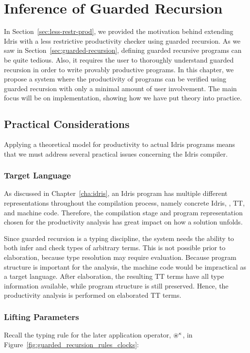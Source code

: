 \chapter{Inference of Guarded Recursion}
\label{cha:infer-guard-recurs}
In Section~\ref{sec:less-restr-prod}, we provided the motivation behind
extending Idris with a less restrictive productivity checker using guarded
recursion. As we saw in Section~\ref{sec:guarded-recursion}, defining guarded
recursive programs can be quite tedious. Also, it requires the user to thoroughly
understand guarded recursion in order to write provably productive programs. In
this chapter, we propose a system where the productivity of programs can be
verified using guarded recursion with only a minimal amount of user
involvement. The main focus will be on implementation, showing how we have put theory into practice.

\section{Practical Considerations}
Applying a theoretical model for productivity to actual Idris programs means
that we must address several practical issues concerning the Idris compiler.

\subsection{Target Language}
As discussed in Chapter~\ref{cha:idris}, an Idris program has multiple different
representations throughout the compilation process, namely concrete Idris,
\IdrisM{}, TT, and machine code. Therefore, the compilation
stage and program representation chosen for the productivity analysis has great
impact on how a solution unfolds.

Since guarded recursion is a typing discipline, the system needs the ability to
both infer and check types of arbitrary terms. This is not possible prior to
elaboration, because type resolution may require evaluation. Because program
structure is important for the analysis, the machine code would be impractical
as a target language. After elaboration, the resulting TT
terms have all type information available, while program structure is still
preserved. Hence, the productivity analysis is performed on elaborated TT terms.

\subsection{Lifting Parameters} %
\label{sec:handling-parameters}
Recall the typing rule for the later application operator, $\circledast^\kappa$, in
Figure~\ref{fig:guarded_recursion_rules_clocks}:

